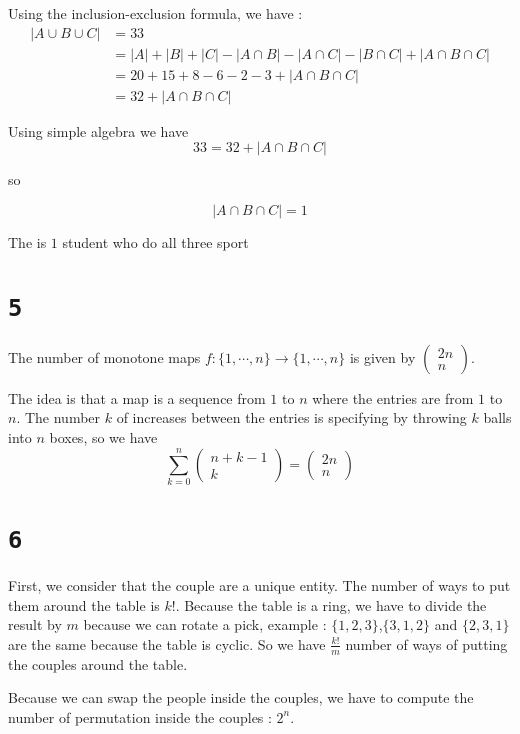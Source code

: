 \documentclass[a4paper,11pt]{report}
\begin{document}
Using the inclusion-exclusion formula, we have :
\begin{align*}
  |A \cup B \cup C| &= 33 \\
                    &= |A| + |B| + |C| - |A \cap B| - |A \cap C| - |B \cap C| + |A \cap B \cap C| \\
                    &= 20 + 15 + 8 - 6 - 2 - 3 + |A \cap B \cap C|\\
                    &= 32 + |A \cap B \cap C|
\end{align*}

Using simple algebra we have
$$
33 = 32 + |A \cap B \cap C|
$$

so

$$
|A \cap B \cap C| = 1
$$

The is $1$ student who do all three sport
\section*{\texttt{5}}
The number of monotone maps $f : \{1,\cdots,n\} \to \{1,\cdots,n\}$ is given by
$\begin{pmatrix} 2n \\ n\end{pmatrix}$.

The idea is that a map is a sequence from $1$ to $n$ where the entries are from
$1$ to $n$. The number $k$ of increases between the entries is specifying by
throwing $k$ balls into $n$ boxes, so we have
$$
\sum_{k=0}^n \begin{pmatrix} n+k-1 \\ k\end{pmatrix} = \begin{pmatrix} 2n \\ n\end{pmatrix}
$$

\section*{\texttt{6}}

First, we consider that the couple are a unique entity. The number of ways to
put them around the table is $k!$. Because the table is a ring, we have to
divide the result by $m$ because we can rotate a pick, example :
$\{1,2,3\}$,$\{3,1,2\}$ and $\{2,3,1\}$ are the same because the table is
cyclic. So we have $\frac{k!}{m}$ number of ways of putting the couples around
the table.

Because we can swap the people inside the couples, we have to compute the number
of permutation inside the couples : $2^n$.
\end{document}
